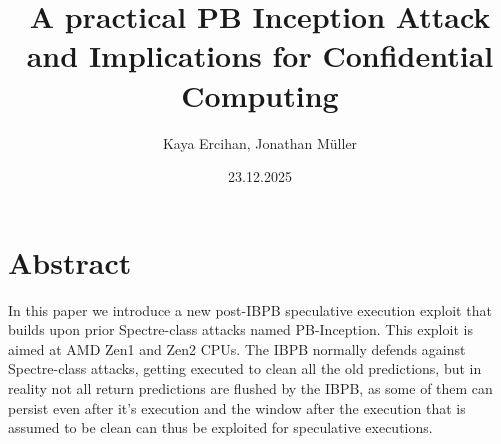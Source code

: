 \documentclass[11pt,a4paper]{article}
\title{A practical PB Inception Attack and Implications for Confidential Computing}
\author{Kaya Ercihan, Jonathan Müller}
\date{23.12.2025}
\begin{document}
\maketitle

% 
% 

\section*{Abstract}
In this paper we introduce a new post-IBPB speculative execution exploit that builds upon prior Spectre-class attacks named PB-Inception. This exploit is aimed at AMD Zen1 and Zen2 CPUs. The IBPB normally defends against Spectre-class attacks, getting executed to clean all the old predictions, but in reality not all return predictions are flushed by the IBPB, as some of them can persist even after it's execution and the window after the execution that is assumed to be clean can thus be exploited for speculative executions. 
\end{document}
